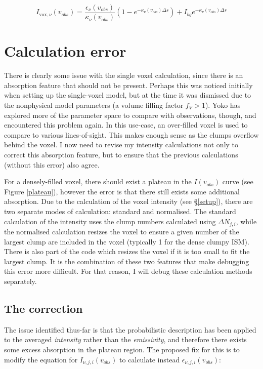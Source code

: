 \documentclass[a4paper]{article}
\begin{document}
    \[
    I_{\mathrm{vox},\nu} (v_{obs}) = \frac{\epsilon_\nu (v_{obs})}{\kappa_\nu (v_{obs})} \left( 1 - e^{-\kappa_\nu (v_{obs}) \Delta s} \right) + I_{bg} e^{-\kappa_\nu (v_{obs}) \Delta s}
    \]

    \pagebreak

    \section{Calculation error}

    There is clearly some issue with the single voxel calculation, since there is an absorption feature that should not be present.
    Perhaps this was noticed initially when setting up the single-voxel model, but at the time it was dismissed due to the nonphysical model parameters (a volume filling factor \(f_V > 1\)).
    Yoko has explored more of the parameter space to compare with observations, though, and encountered this problem again.
    In this use-case, an over-filled voxel is used to compare to various lines-of-sight.
    This makes enough sense as the clumps overflow behind the voxel.
    I now need to revise my intensity calculations not only to correct this absorption feature, but to ensure that the previous calculations (without this error) also agree.

    For a densely-filled voxel, there should exist a plateau in the \(I(v_{obs})\) curve (see Figure \ref{plateau}), however the error is that there still exists some additional absorption.
    Due to the calculation of the voxel intensity (see \S \ref{setup}), there are two separate modes of calculation: standard and normalised.
    The standard calculation of the intensity uses the clump numbers calculated using \(\Delta N_{j,i}\), while the normalised calculation resizes the voxel to ensure a given number of the largest clump are included in the voxel (typically 1 for the dense clumpy ISM).
    There is also part of the code which resizes the voxel if it is too small to fit the largest clump.
    It is the combination of these two features that make debugging this error more difficult.
    For that reason, I will debug these calculation methods separately.

    \subsection{The correction}

    The issue identified thus-far is that the probabilistic description has been applied to the averaged \textit{intensity} rather than the \textit{emissivity}, and therefore there exists some excess absorption in the plateau region.
    The proposed fix for this is to modify the equation for \(I_{\nu, j, i} (v_{obs})\) to calculate instead \(\epsilon_{\nu, j, i} (v_{obs})\):
\end{document}
